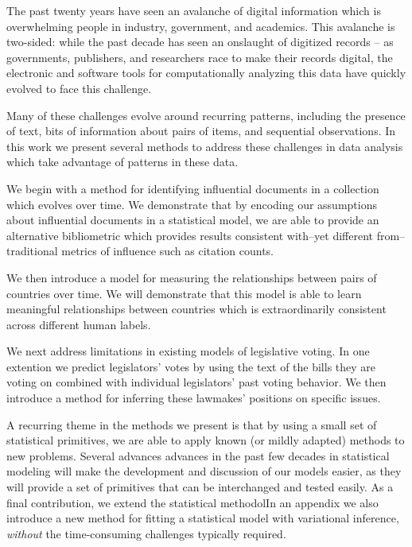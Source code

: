 The past twenty years have seen an avalanche of digital information which is overwhelming people in industry, government, and academics.  This avalanche is two-sided: while the past decade has seen an onslaught of digitized records -- as governments, publishers, and researchers race to make their records digital, the electronic and software tools for computationally analyzing this data have quickly evolved to face this challenge.

Many of these challenges evolve around recurring patterns, including the presence of text, bits of information about pairs of items, and sequential observations.  In this work we present several methods to address these challenges in data analysis which take advantage of patterns in these data.

We begin with a method for identifying influential documents in a collection which evolves over time.  We demonstrate that by encoding our assumptions about influential documents in a statistical model, we are able to provide an alternative bibliometric which provides results consistent with--yet different from--traditional metrics of influence such as citation counts.

We then introduce a model for measuring the relationships between pairs of countries over time.  We will demonstrate that this model is able to learn meaningful relationships between countries which is extraordinarily consistent across different human labels.

We next address limitations in existing models of legislative voting.  In one extention we predict legislators' votes by using the text of the bills they are voting on combined with individual legislators' past voting behavior.  We then introduce a method for inferring these lawmakes' positions on specific issues.

A recurring theme in the methods we present is that by using a small set of statistical primitives, we are able to apply known (or mildly adapted) methods to new problems.  Several advances advances in the past few decades in statistical modeling will make the development and discussion of our models easier, as they will provide a set of primitives that can be interchanged and tested easily.  As a final contribution, we extend the statistical methodolIn an appendix we also introduce a new method for fitting a statistical model with variational inference, \emph{without} the time-consuming challenges typically required.

